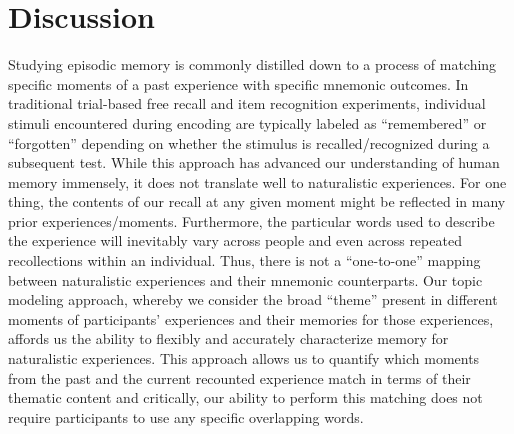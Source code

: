 \documentclass{article}
\begin{document}
{%

\section{Discussion}
\label{sec:discussion}

Studying episodic memory is commonly distilled down to a process of matching specific moments of a past experience with specific mnemonic outcomes.  In traditional trial-based free recall and item recognition experiments, individual stimuli encountered during encoding are typically labeled as ``remembered'' or ``forgotten'' depending on whether the stimulus is recalled/recognized during a subsequent test. While this approach has advanced our understanding of human memory immensely, it does not translate well to naturalistic experiences. For one thing, the contents of our recall at any given moment might be reflected in many prior experiences/moments. Furthermore, the particular words used to describe the experience will inevitably vary across people and even across repeated recollections within an individual. Thus, there is not a ``one-to-one'' mapping between naturalistic experiences and their mnemonic counterparts. Our topic modeling approach, whereby we consider the broad ``theme'' present in different moments of participants' experiences and their memories for those experiences, affords us the ability to flexibly and accurately characterize memory for naturalistic experiences. This approach allows us to quantify which moments from the past and the current recounted experience match in terms of their thematic content and critically, our ability to perform this matching does not require participants to use any specific overlapping words.

}
\end{document}
